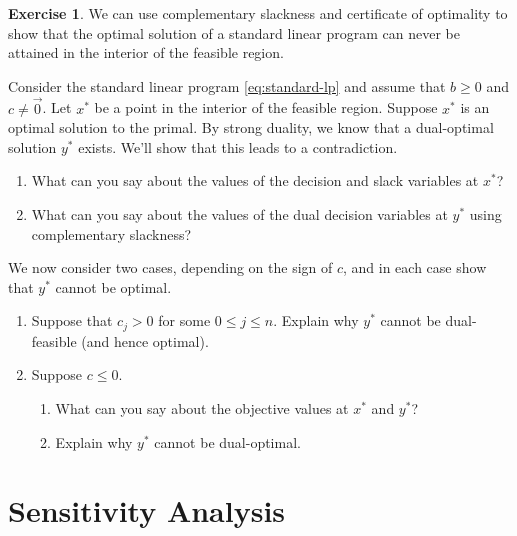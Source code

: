 \documentclass[
]{book}
\providecommand{\tightlist}{%
  \setlength{\itemsep}{0pt}\setlength{\parskip}{0pt}}
\theoremstyle{definition}
\theoremstyle{definition}
\theoremstyle{definition}
\newtheorem{exercise}{Exercise}[chapter]
\theoremstyle{definition}
\theoremstyle{remark}
\begin{document}
\begin{exercise}

We can use complementary slackness and certificate of optimality to show that the optimal solution of a standard linear program can never be attained in the interior of the feasible region.

Consider the standard linear program \eqref{eq:standard-lp} and assume that \(b \ge 0\) and \(c \neq \vec{0}\).
Let \(x^*\) be a point in the interior of the feasible region. Suppose \(x^*\) is an optimal solution to
the primal. By strong duality, we know that a dual-optimal solution \(y^*\) exists. We'll show that
this leads to a contradiction.

\begin{enumerate}
\def\labelenumi{\arabic{enumi}.}
\tightlist
\item
  What can you say about the values of the decision and slack variables at \(x^*\)?
\item
  What can you say about the values of the dual decision variables at \(y^*\) using complementary slackness?
\end{enumerate}

We now consider two cases, depending on the sign of \(c\), and in each case show that \(y^*\) cannot be optimal.

\begin{enumerate}
\def\labelenumi{\arabic{enumi}.}
\tightlist
\item
  Suppose that \(c_j > 0\) for some \(0 \le j \le n\). Explain why \(y^*\) cannot be dual-feasible (and hence optimal).
\item
  Suppose \(c \le 0\).

  \begin{enumerate}
  \def\labelenumii{\arabic{enumii}.}
  \tightlist
  \item
    What can you say about the objective values at \(x^*\) and \(y^*\)?
  \item
    Explain why \(y^*\) cannot be dual-optimal.
  \end{enumerate}
\end{enumerate}

\end{exercise}

\hypertarget{sensitivity-analysis}{%
\chapter{Sensitivity Analysis}\label{sensitivity-analysis}}
\end{document}
